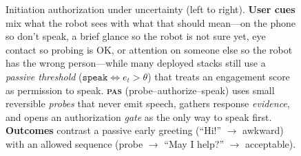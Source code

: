 \begin{figure}[t]
{%
}
\caption{Initiation authorization under uncertainty (left to right).
\textbf{User cues} mix what the robot sees with what that should mean---on the
phone so don't speak, a brief glance so the robot is not sure yet, eye contact so
probing is OK, or attention on someone else so the robot has the wrong
person---while many deployed stacks still use a \emph{passive threshold}
($\texttt{speak} \Leftrightarrow e_t>\theta$) that treats an engagement score
as permission to speak.
\textbf{\textsc{pas}} (probe--authorize--speak) uses small reversible
\emph{probes} that never emit speech, gathers response
\emph{evidence}, and opens an authorization \emph{gate} as the only way to
speak first.
\textbf{Outcomes} contrast a passive early greeting (``Hi!'' $\rightarrow$
awkward) with an allowed sequence (probe $\rightarrow$ ``May I help?''
$\rightarrow$ acceptable).}
\label{fig:initiation}
\end{figure}
